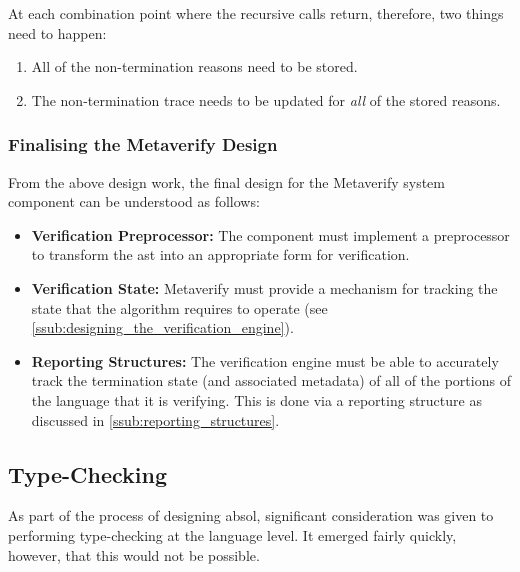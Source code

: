 At each combination point where the recursive calls return, therefore, two things need to happen:
\begin{enumerate}
    \item All of the non-termination reasons need to be stored.
    \item The non-termination trace needs to be updated for \textit{all} of the stored reasons. 
\end{enumerate}


\subsubsection{Finalising the Metaverify Design} %
\label{ssub:finalising_the_metaverify_design}
From the above design work, the final design for the Metaverify system component can be understood as follows:
\begin{itemize}
    \item \textbf{Verification Preprocessor:} The component must implement a preprocessor to transform the \gls{ast} into an appropriate form for verification.
    \item \textbf{Verification State:} Metaverify must provide a mechanism for tracking the state that the algorithm requires to operate (see \autoref{ssub:designing_the_verification_engine}).
    \item \textbf{Reporting Structures:} The verification engine must be able to accurately track the termination state (and associated metadata) of all of the portions of the language that it is verifying. 
    This is done via a reporting structure as discussed in \autoref{ssub:reporting_structures}.
\end{itemize}



\subsection{Type-Checking} %
\label{sub:type_checking}
As part of the process of designing \gls{absol}, significant consideration was given to performing type-checking at the language level. 
It emerged fairly quickly, however, that this would not be possible. \\

